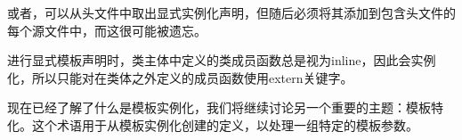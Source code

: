 或者，可以从头文件中取出显式实例化声明，但随后必须将其添加到包含头文件的每个源文件中，而这很可能被遗忘。

进行显式模板声明时，类主体中定义的类成员函数总是视为inline，因此会实例化，所以只能对在类体之外定义的成员函数使用extern关键字。

现在已经了解了什么是模板实例化，我们将继续讨论另一个重要的主题：模板特化。这个术语用于从模板实例化创建的定义，以处理一组特定的模板参数。















